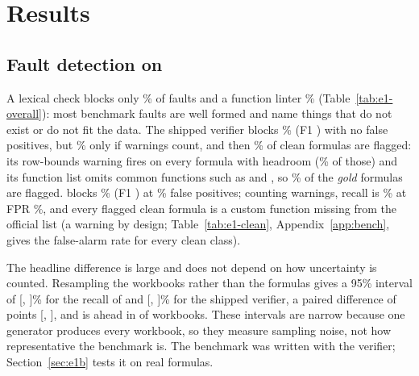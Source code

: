 \section{Results}
\label{sec:results}

\subsection{Fault detection on \sheetfault}
\label{sec:e1}


A lexical check blocks only \eonesyntaxrejectR\% of faults and a function linter \eonelintrejectR\% (Table~\ref{tab:e1-overall}): most benchmark faults are well formed and name things that do not exist or do not fit the data. The shipped verifier blocks \eonevonerejectR\% (F1 \eonevonerejectF) with no false positives, but \eonevoneflagR\% only if warnings count, and then \eonevoneflagFPR\% of clean formulas are flagged: its row-bounds warning fires on every formula with headroom (\cleanHeadroomVone\% of those) and its function list omits common functions such as  and , so \cleanGoldVone\% of the \emph{gold} formulas are flagged. \gc{} blocks \eonevtworejectR\% (F1 \eonevtworejectF) at \eonevtworejectFPR\% false positives; counting warnings, recall is \eonevtwoflagR\% at FPR \eonevtwoflagFPR\%, and every flagged clean formula is a custom function missing from the official list (a warning by design; Table~\ref{tab:e1-clean}, Appendix~\ref{app:bench}, gives the false-alarm rate for every clean class).

The headline difference is large and does not depend on how uncertainty is counted. Resampling the \clWbN{} workbooks rather than the formulas gives a 95\% interval of [\clVtwoRecallLo, \clVtwoRecallHi]\% for the recall of \gc{} and [\clVoneRecallLo, \clVoneRecallHi]\% for the shipped verifier, a paired difference of \clDiffRecall{} points [\clDiffRecallLo, \clDiffRecallHi], and \gc{} is ahead in \clWbBetter{} of \clWbN{} workbooks. These intervals are narrow because one generator produces every workbook, so they measure sampling noise, not how representative the benchmark is. The benchmark was written with the verifier; Section~\ref{sec:e1b} tests it on real formulas.

